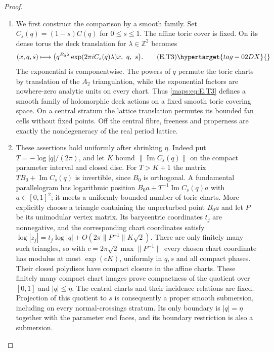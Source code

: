 \begin{proof}
\begin{enumerate}[label={$\langle1\rangle$\arabic*.},leftmargin=*]
\item We first construct the comparison by a smooth family.  Set
$C_s(q)=(1-s)C(q)$ for $0\leq s\leq1$.  The affine toric cover
is fixed.  On its dense torus the deck translation for
$\lambda\in\mathbb Z^2$ becomes
\[
 (x,q,s)\longmapsto
 \bigl(q^{B_0\lambda}
       \exp(2\pi i C_s(q)\lambda)x,\ q,\ s\bigr).
 \tag{E.T3}\hypertarget{tag-02DX}{}\label{maps:eq:E.T3}
\]
The exponential is componentwise.  The powers of $q$ permute
the toric charts by translation of the $A_2$ triangulation,
while the exponential factors are nowhere-zero analytic units
on every chart.  Thus \eqref{maps:eq:E.T3} defines a smooth family of
holomorphic deck actions on a fixed smooth toric covering
space.  On a central stratum the lattice translation permutes
its bounded fan cells without fixed points.  Off the central
fibre, freeness and properness are exactly the nondegeneracy
of the real period lattice.

\item These assertions hold uniformly after shrinking $\eta$.
Indeed put $T=-\log|q|/(2\pi)$, and let $K$ bound
$\|\operatorname{Im}C_s(q)\|$ on the compact parameter interval
and closed disc.  For $T>K+1$ the matrix
$TB_0+\operatorname{Im}C_s(q)$ is invertible, since $B_0$ is
orthogonal.  A fundamental parallelogram has logarithmic
position
$B_0a+T^{-1}\operatorname{Im}C_s(q)a$ with
$a\in[0,1]^2$; it meets a uniformly bounded number of toric
charts.  More explicitly choose a triangle containing the
unperturbed point $B_0a$ and let $P$ be its unimodular vertex
matrix.  Its barycentric coordinates $t_j$ are nonnegative,
and the corresponding chart coordinates satisfy
$\log|z_j|=t_j\log|q|+
O(2\pi\|P^{-1}\|K\sqrt2)$.
There are only finitely many such triangles, so with
$c=2\pi\sqrt2\max\|P^{-1}\|$ every chosen chart coordinate
has modulus at most $\exp(cK)$, uniformly in $q,s$ and
all compact phases.  Their closed polydiscs have compact
closure in the affine charts.  These finitely many compact
chart images prove
compactness of the quotient over $[0,1]$ and $|q|\leq\eta$.
The central charts and their incidence relations are fixed.
Projection of this quotient to $s$ is consequently a proper
smooth submersion, including on every normal-crossings stratum.
Its only boundary is $|q|=\eta$ together with the parameter
end faces, and its boundary restriction is also a submersion.


\end{enumerate}
\end{proof}
